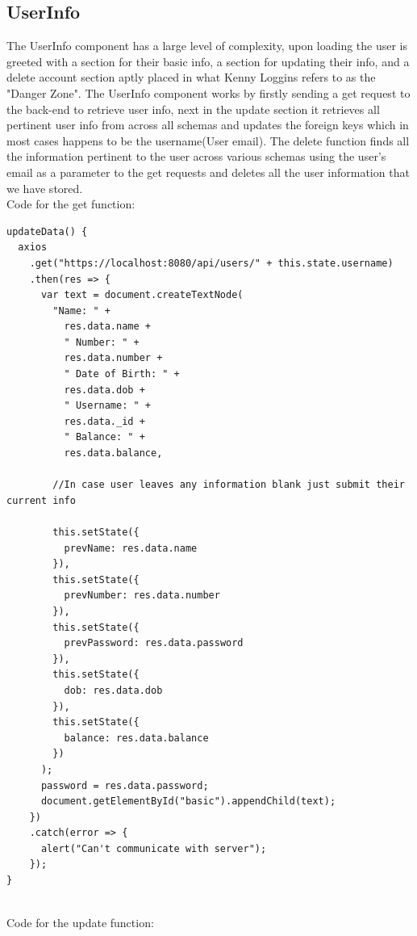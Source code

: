\subsection{UserInfo}
The UserInfo component has a large level of complexity, upon loading the user is
greeted with a section for their basic info, a section for updating their info,
and a delete account section aptly placed in what Kenny Loggins refers to as the "Danger Zone".
The UserInfo component works by firstly sending a get request to the back-end to retrieve user info,
next in the update section it retrieves all pertinent user info from across all schemas and
updates the foreign keys which in most cases happens to be the username(User email).  The delete function
finds all the information pertinent to the user across various schemas using the user's email as
a parameter to the get requests and deletes all the user information that we have stored.
\\
Code for the get function:
\begin{verbatim}
updateData() {
  axios
    .get("https://localhost:8080/api/users/" + this.state.username)
    .then(res => {
      var text = document.createTextNode(
        "Name: " +
          res.data.name +
          " Number: " +
          res.data.number +
          " Date of Birth: " +
          res.data.dob +
          " Username: " +
          res.data._id +
          " Balance: " +
          res.data.balance,

        //In case user leaves any information blank just submit their current info

        this.setState({
          prevName: res.data.name
        }),
        this.setState({
          prevNumber: res.data.number
        }),
        this.setState({
          prevPassword: res.data.password
        }),
        this.setState({
          dob: res.data.dob
        }),
        this.setState({
          balance: res.data.balance
        })
      );
      password = res.data.password;
      document.getElementById("basic").appendChild(text);
    })
    .catch(error => {
      alert("Can't communicate with server");
    });
}
\end{verbatim}
\\
Code for the update function:
